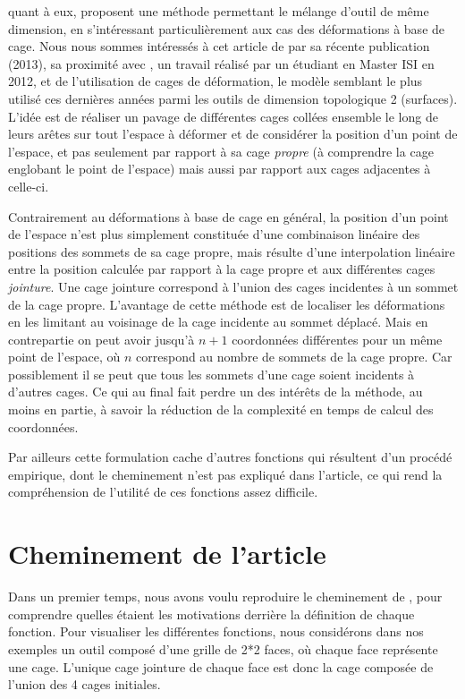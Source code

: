 \cite{GPCP13} quant à eux, proposent une méthode permettant le mélange
d'outil de même dimension, en s'intéressant particulièrement aux cas
des déformations à base de cage.  Nous nous sommes intéressés à cet
article de par sa récente publication (2013), sa proximité avec
\cite{Hur12}, un travail réalisé par un étudiant en Master ISI en
2012, et de l'utilisation de cages de déformation, le modèle semblant
le plus utilisé ces dernières années parmi les outils de dimension
topologique 2 (surfaces). L'idée est de réaliser un pavage de
différentes cages collées ensemble le long de leurs arêtes sur tout
l'espace à déformer et de considérer la position d'un point de
l'espace, et pas seulement par rapport à sa cage \textit{propre} (à
comprendre la cage englobant le point de l'espace) mais aussi par
rapport aux cages adjacentes à celle-ci.

Contrairement au déformations à base de cage en général, la position
d'un point de l'espace n'est plus simplement constituée d'une
combinaison linéaire des positions des sommets de sa cage propre, mais
résulte d'une interpolation linéaire entre la position calculée par
rapport à la cage propre et aux différentes cages
\textit{jointure}. Une cage jointure correspond à l'union des cages
incidentes à un sommet de la cage propre. L'avantage de cette méthode
est de localiser les déformations en les limitant au voisinage de la
cage incidente au sommet déplacé. Mais en contrepartie on peut avoir
jusqu'à $n+1$ coordonnées différentes pour un même point de l'espace, où
$n$ correspond au nombre de sommets de la cage propre. Car
possiblement il se peut que tous les sommets d'une cage soient
incidents à d'autres cages. Ce qui au final fait perdre un des
intérêts de la méthode, au moins en partie, à savoir la réduction de
la complexité en temps de calcul des coordonnées.

Par ailleurs cette formulation cache d'autres fonctions qui résultent
d'un procédé empirique, dont le cheminement n'est pas expliqué dans
l'article, ce qui rend la compréhension de l'utilité de ces fonctions
assez difficile.

\section{Cheminement de l'article}
Dans un premier temps, nous avons voulu reproduire le cheminement de
\cite{GPCP13}, pour comprendre quelles étaient les motivations
derrière la définition de chaque fonction. Pour visualiser les
différentes fonctions, nous considérons dans nos exemples un outil
composé d'une grille de 2*2 faces, où chaque face représente une
cage. L'unique cage jointure de chaque face est donc la cage composée
de l'union des 4 cages initiales.

